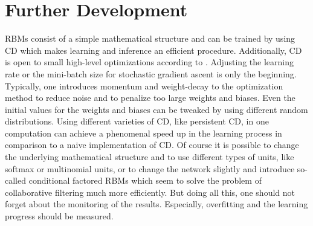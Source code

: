 \documentclass[crop=false,10pt]{standalone}
\begin{document}
  \section{Further Development} %
  \label{sec:Further Development}
    RBMs consist of a simple mathematical structure and can be trained by using CD which makes learning and inference an efficient procedure.
    Additionally, CD is open to small high-level optimizations according to \cite{Hinton2010}.
    Adjusting the learning rate or the mini-batch size for stochastic gradient ascent is only the beginning.
    Typically, one introduces momentum and weight-decay to the optimization method to reduce noise and to penalize too large weights and biases.
    Even the initial values for the weights and biases can be tweaked by using different random distributions.
    Using different varieties of CD, like persistent CD, in one computation can achieve a phenomenal speed up in the learning process in comparison to a naive implementation of CD.
    Of course it is possible to change the underlying mathematical structure and to use different types of units, like softmax or multinomial units, or to change the network slightly and introduce so-called conditional factored RBMs which seem to solve the problem of collaborative filtering much more efficiently.
    But doing all this, one should not forget about the monitoring of the results.
    Especially, overfitting and the learning progress should be measured.
    \cite{Hinton2007,Hinton2010}
\end{document}
